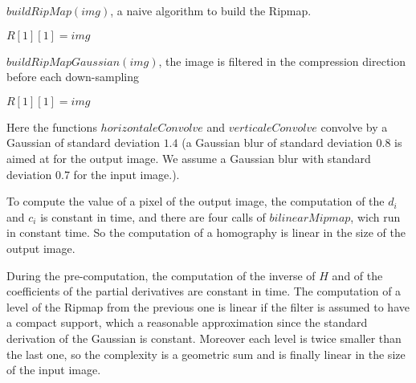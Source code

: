 \medbreak
\medbreak
\begin{algorithm}[H]
\caption{$buildRipMap(img)$, a naive algorithm to build the Ripmap.}
\label{buildRipmap1}
$R[1][1] = img$\;

\end{algorithm}
\medbreak
\medbreak
\medbreak
\medbreak
\begin{algorithm}[H]
\caption{$buildRipMapGaussian(img)$, the image is filtered in the compression direction before each down-sampling}
\label{buildRipmap2}
$R[1][1] = img$\;

\end{algorithm}
\medbreak
\medbreak

\noindent Here the functions $horizontaleConvolve$ and $verticaleConvolve$ convolve by a Gaussian of standard deviation $1.4$ \cite{morel2011sift} (a Gaussian blur of standard deviation 0.8 is aimed at for the output image. We assume a Gaussian blur with standard deviation 0.7 for the input image.).



To compute the value of a pixel of the output image, the computation of the $d_i$ and $c_i$ is constant in time, and there are four calls of $bilinearMipmap$, wich run in constant time. So the computation of a homography is linear in the size of the output image.

During the pre-computation, the computation of the inverse of $H$ and of the coefficients of the partial derivatives are constant in time. The computation of a level of the Ripmap from the previous one is linear if the filter is assumed to have a compact support, which a reasonable approximation since the standard derivation of the Gaussian is constant. Moreover each level is twice smaller than the last one, so the complexity is a geometric sum and is finally linear in the size of the input image.

